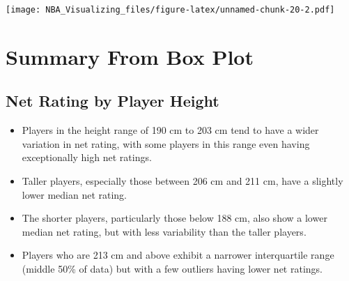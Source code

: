 \documentclass[
]{book}
\newenvironment{Shaded}{\begin{snugshade}}{\end{snugshade}}
\newcommand{\AttributeTok}[1]{\textcolor[rgb]{0.13,0.29,0.53}{#1}}
\newcommand{\DecValTok}[1]{\textcolor[rgb]{0.00,0.00,0.81}{#1}}
\newcommand{\FunctionTok}[1]{\textcolor[rgb]{0.13,0.29,0.53}{\textbf{#1}}}
\newcommand{\NormalTok}[1]{#1}
\newcommand{\OtherTok}[1]{\textcolor[rgb]{0.56,0.35,0.01}{#1}}
\newcommand{\SpecialCharTok}[1]{\textcolor[rgb]{0.81,0.36,0.00}{\textbf{#1}}}
\newcommand{\StringTok}[1]{\textcolor[rgb]{0.31,0.60,0.02}{#1}}
\providecommand{\tightlist}{%
  \setlength{\itemsep}{0pt}\setlength{\parskip}{0pt}}
\begin{document}
\begin{Shaded}
\end{Shaded}

\texttt{[image: NBA\_Visualizing\_files/figure-latex/unnamed-chunk-20-2.pdf]}

\hypertarget{summary-from-box-plot}{%
\section{Summary From Box Plot}\label{summary-from-box-plot}}

\hypertarget{net-rating-by-player-height}{%
\subsection{Net Rating by Player Height}\label{net-rating-by-player-height}}

\begin{itemize}
\tightlist
\item
  Players in the height range of 190 cm to 203 cm tend to have a wider variation in net rating, with some players in this range even having exceptionally high net ratings.
\item
  Taller players, especially those between 206 cm and 211 cm, have a slightly lower median net rating.
\item
  The shorter players, particularly those below 188 cm, also show a lower median net rating, but with less variability than the taller players.
\item
  Players who are 213 cm and above exhibit a narrower interquartile range (middle 50\% of data) but with a few outliers having lower net ratings.
\end{itemize}
\end{document}
